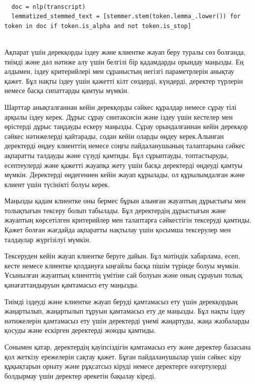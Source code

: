 \begin{lstlisting}

  doc = nlp(transcript)
  lemmatized_stemmed_text = [stemmer.stem(token.lemma_.lower()) for token in doc if token.is_alpha and not token.is_stop]
  
\end{lstlisting}



\begin{multicols}{2}
Ақпарат үшін дерекқорды іздеу және клиентке жауап беру туралы сөз
болғанда, тиімді және дәл нәтиже алу үшін белгілі бір қадамдарды орындау
маңызды. Ең алдымен, іздеу критерийлері мен сұраныстың негізгі
параметрлерін анықтау қажет. Бұл нақты іздеу үшін қажетті кілт сөздерді,
күндерді, деректер түрлерін немесе басқа сипаттарды қамтуы мүмкін.

Шарттар анықталғаннан кейін дерекқорды сәйкес құралдар немесе сұрау тілі
арқылы іздеу керек. Дұрыс сұрау синтаксисін және іздеу үшін кестелер мен
өрістерді дұрыс таңдауды ескеру маңызды. Сұрау орындалғаннан кейін
дерекқор сәйкес нәтижелерді қайтарады, содан кейін оларды өңдеу
керек.Алынған деректерді өңдеу клиенттің немесе соңғы пайдаланушының
талаптарына сәйкес ақпаратты талдауды және сүзуді қамтиды. Бұл
сұрыптауды, топтастыруды, есептеулерді және қажетті жауапқа жету үшін
басқа деректерді өңдеуді қамтуы мүмкін. Деректерді өңдегеннен кейін
жауап құрылады, ол құрылымдалған және клиент үшін түсінікті болуы керек.

Маңызды қадам клиентке оны бермес бұрын алынған жауаптың дұрыстығы мен
толықтығын тексеру болып табылады. Бұл деректердің дұрыстығын және
жауаптың көрсетілген критерийлер мен талаптарға сәйкестігін тексеруді
қамтиды. Қажет болған жағдайда ақпаратты нақтылау үшін қосымша
тексерулер мен талдаулар жүргізілуі мүмкін.

Тексеруден кейін жауап клиентке беруге дайын. Бұл мәтіндік хабарлама,
есеп, кесте немесе клиентке қолдануға ыңғайлы басқа пішім түрінде болуы
мүмкін. Ұсынылған жауаптың клиенттің үмітіне сай болуын және оның
сұрауын толық қанағаттандыруын қамтамасыз ету маңызды.

Тиімді іздеуді және клиентке жауап беруді қамтамасыз ету үшін
дерекқордың жаңартылып, жаңартылып тұруын қамтамасыз ету де маңызды. Бұл
нақты іздеу нәтижелерін қамтамасыз ету үшін деректерді үнемі жаңартуды,
жаңа жазбаларды қосуды және ескірген деректерді жоюды қамтиды.

Сонымен қатар, деректердің қауіпсіздігін қамтамасыз ету және деректер
базасына қол жеткізу ережелерін сақтау қажет. Бұған пайдаланушылар үшін
сәйкес кіру құқықтарын орнату және рұқсатсыз кіруді немесе деректерге
өзгертулерді болдырмау үшін деректер әрекетін бақылау кіреді.


\end{multicols}
